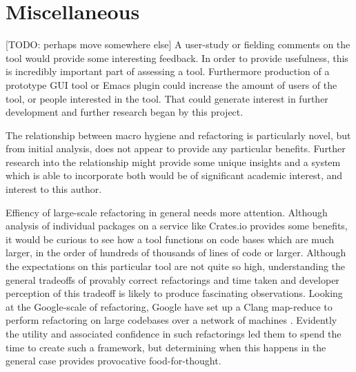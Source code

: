 \section{Miscellaneous}

[TODO: perhaps move somewhere else]
A user-study or fielding comments on the tool would provide some interesting feedback. In order to provide usefulness, this is incredibly important part of assessing a tool. Furthermore production of a prototype GUI tool or Emacs plugin could increase the amount of users of the tool, or people interested in the tool. That could generate interest in further development and further research began by this project.

The relationship between macro hygiene and refactoring is particularly novel, but from initial analysis, does not appear to provide any particular benefits. Further research into the relationship might provide some unique insights and a system which is able to incorporate both would be of significant academic interest, and interest to this author.

Effiency of large-scale refactoring in general needs more attention. Although analysis of individual packages on a service like Crates.io provides some benefits, it would be curious to see how a tool functions on code bases which are much larger, in the order of hundreds of thousands of lines of code or larger. Although the expectations on this particular tool are not quite so high, understanding the general tradeoffs of provably correct refactorings and time taken and developer perception of this tradeoff is likely to produce fascinating observations. Looking at the Google-scale of refactoring, Google have set up a Clang map-reduce to perform refactoring on large codebases over a network of machines \cite{carruth2011clang}. Evidently the utility and associated confidence in such refactorings led them to spend the time to create such a framework, but determining when this happens in the general case provides provocative food-for-thought.

